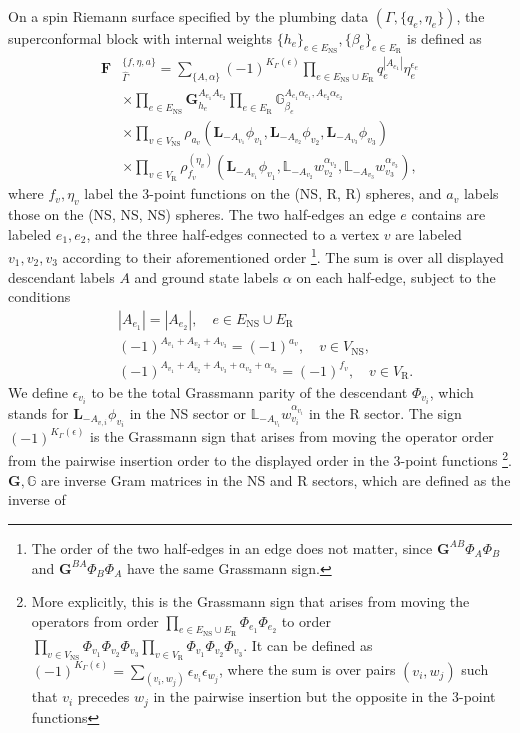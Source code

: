 \documentclass[aps,10pt,twocolumn,superscriptaddress]{revtex4-2}
\def\ie{\begin{equation}\begin{aligned}}
\def\fe{\end{aligned}\end{equation}}
\def\NS{\mathrm{NS}}
\def\R{\mathrm{R}}
\begin{document}
On a spin Riemann surface specified by the plumbing data $(\Gamma, \{q_e, \eta_e\})$, the superconformal block with internal weights $\{h_e\}_{e\in E_{\NS}}, \{\beta_e\}_{e\in E_\R}$ is defined as
\ie \label{scblock}
\mathbf{F}&{}^{\{f, \eta, a\}}_{\hat{\Gamma}} = \sum_{\{A, \alpha\}}(-1)^{K_{\Gamma}(\epsilon)} \prod_{e\in E_\NS\cup E_\R} q_e^{|A_{e_1}|}\eta_e^{\epsilon_e}\\
&\times \prod_{e\in E_\NS} \mathbf{G}_{h_e}^{A_{e_1}A_{e_2}} \prod_{e\in E_\R} \mathbb{G}_{\beta_e}^{A_{e_1}\alpha_{e_1},A_{e_2}\alpha_{e_2}}\\
&\times \prod_{v \in V_\NS} \rho_{a_v}(\mathbf L_{-A_{v_1}}\phi_{v_1},\mathbf L_{-A_{v_2}}\phi_{v_2},\mathbf L_{-A_{v_3}}\phi_{v_3})\\
&\times\prod_{v\in V_\R}\rho_{f_v}^{(\eta_v)}(\mathbf L_{-A_{v_1}}\phi_{v_1},\mathbb L_{-A_{v_2}}w_{v_2}^{\alpha_{v_2}},\mathbb L_{-A_{v_3}}w_{v_3}^{\alpha_{v_3}}),
\fe
where $f_v, \eta_v$ label the 3-point functions on the (NS, R, R) spheres, and $a_v$ labels those on the (NS, NS, NS) spheres. The two half-edges an edge $e$ contains are labeled $e_1, e_2$, and the three half-edges connected to a vertex $v$ are labeled $v_1, v_2, v_3$ according to their aforementioned order \footnote{The order of the two half-edges in an edge does not matter, since $\mathbf{G}^{AB}\Phi_A\Phi_B$ and $\mathbf{G}^{BA}\Phi_B\Phi_A$ have the same Grassmann sign.}. The sum is over all displayed descendant labels $A$ and ground state labels $\alpha$ on each half-edge, subject to the conditions
\ie \label{selection}
&|A_{e_1}| = |A_{e_2}|,\quad e\in E_{\NS}\cup E_\R\\
&(-1)^{A_{v_1}+A_{v_2}+A_{v_3}}=(-1)^{a_v},\quad v\in V_\NS,\\
&(-1)^{A_{v_1}+A_{v_2}+A_{v_3}+\alpha_{v_2}+\alpha_{v_3}}=(-1)^{f_v},\quad v\in V_\R.
\fe
We define $\epsilon_{v_i}$ to be the total Grassmann parity of the descendant $\Phi_{v_i}$, which stands for $\mathbf{L}_{-A_{v,i}}\phi_{v_i}$ in the NS sector or $\mathbb{L}_{-A_{v_i}}w_{v_i}^{\alpha_{v_i}}$ in the R sector. The sign $(-1)^{K_\Gamma(\epsilon)}$ is the Grassmann sign that arises from moving the operator order from the pairwise insertion order to the displayed order in the 3-point functions \footnote{More explicitly, this is the Grassmann sign that arises from moving the operators from order $\prod_{e\in E_\NS\cup E_\R}\Phi_{e_1}\Phi_{e_2}$ to order $\prod_{v\in V_\NS}\Phi_{v_1}\Phi_{v_2}\Phi_{v_3}\prod_{v\in V_\R}\Phi_{v_1}\Phi_{v_2}\Phi_{v_3}$. It can be defined as $(-1)^{K_\Gamma(\epsilon)}=\sum_{(v_i, w_j)}\epsilon_{v_i}\epsilon_{w_j}$, where the sum is over pairs $(v_i, w_j)$ such that $v_i$ precedes $w_j$ in the pairwise insertion but the opposite in the 3-point functions}. $\mathbf{G}, \mathbb{G}$ are inverse Gram matrices in the NS and R sectors, which are defined as the inverse of
\end{document}
